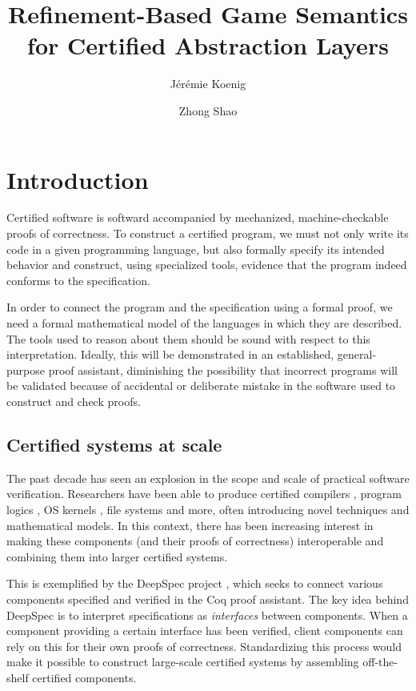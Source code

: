 \documentclass[sigplan,10pt,review,anonymous]{acmart}
\title{Refinement-Based Game Semantics for Certified Abstraction Layers} %
\author{J\'er\'emie Koenig}
\affiliation{Yale University}
\author{Zhong Shao}
\affiliation{Yale University}
\begin{document}
\maketitle

\section{Introduction} %


Certified software
is softward accompanied by
mechanized, machine-checkable proofs of correctness.
To construct a certified program,
we must not only write its code in a given programming language,
but also formally specify its intended behavior
and construct, using specialized tools,
evidence that the program
indeed conforms to the specification.

In order to connect the program and the specification
using a formal proof,
we need a formal mathematical model of
the languages in which they are described.
The tools used to reason about them
should be sound with respect to this interpretation.
Ideally,
this will be demonstrated in an established,
general-purpose proof assistant,
diminishing the possibility that
incorrect programs will be validated because of
accidental or deliberate mistake
in the software used to construct and check proofs.


\subsection{Certified systems at scale} %

The past decade has seen an explosion
in the scope and scale of practical software verification.
Researchers have been able to produce certified
compilers \cite{compcert},
program logics \cite{vst},
OS kernels \cite{sel4,popl15},
file systems \cite{fscq} and more,
often introducing novel techniques
and mathematical models.
In this context,
there has been increasing interest in
making these components (and their proofs of correctness)
interoperable and
combining them into larger certified systems.

This is exemplified by the DeepSpec project \cite{deepspec},
which seeks to connect various components
specified and verified in the Coq proof assistant.
The key idea behind DeepSpec
is to interpret specifications as \emph{interfaces}
between components.
When a component providing a certain interface
has been verified,
client components can rely on this
for their own proofs of correctness.
Standardizing this process would make it possible
to construct large-scale certified systems
by assembling off-the-shelf certified components.
\end{document}
